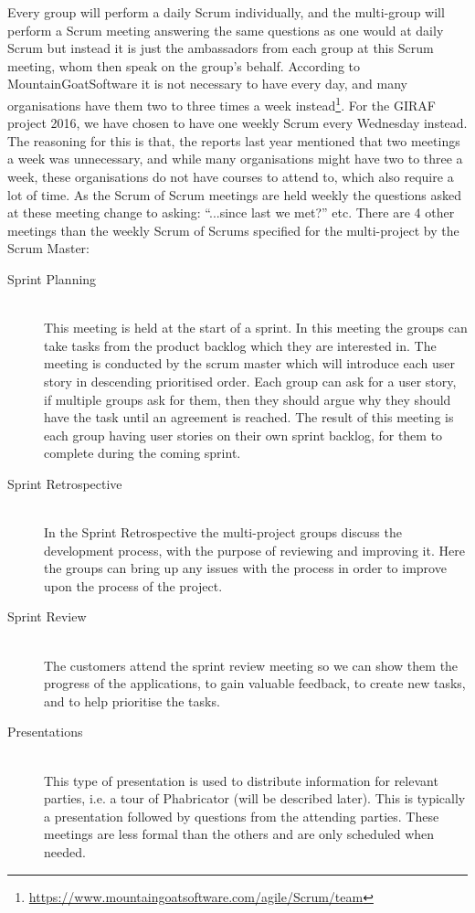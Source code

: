 Every group will perform a daily Scrum individually, and the multi-group will perform a Scrum meeting answering the same questions as one would at daily Scrum but instead it is just the ambassadors from each group at this Scrum meeting, whom then speak on the group's behalf.
According to MountainGoatSoftware it is not necessary to have every day, and many organisations have them two to three times a week instead\footnote{\url{https://www.mountaingoatsoftware.com/agile/Scrum/team}}.
For the GIRAF project 2016, we have chosen to have one weekly Scrum every Wednesday instead.
The reasoning for this is that, the reports last year mentioned that two meetings a week was unnecessary, and while many organisations might have two to three a week, these organisations do not have courses to attend to, which also require a lot of time.
As the Scrum of Scrum meetings are held weekly the questions asked at these meeting change to asking: ``...since last we met?'' etc.
There are 4 other meetings than the weekly Scrum of Scrums specified for the multi-project by the Scrum Master:

\begin{description}
	\item[Sprint Planning] \hfill \\
	This meeting is held at the start of a sprint. 
	In this meeting the groups can take tasks from the product backlog which they are interested in. 
	The meeting is conducted by the scrum master which will introduce each user story in descending prioritised order. 
	Each group can ask for a user story, if multiple groups ask for them, then they should argue why they should have the task until an agreement is reached. 
	The result of this meeting is each group having user stories on their own sprint backlog, for them to complete during the coming sprint. 
	\item[Sprint Retrospective] \hfill \\
	In the Sprint Retrospective the multi-project groups discuss the development process, with the purpose of reviewing and improving it. 
	Here the groups can bring up any issues with the process in order to improve upon the process of the project.
	\item[Sprint Review] \hfill \\
	The customers attend the sprint review meeting so we can show them the progress of the applications, to gain valuable feedback, to create new tasks, and to help prioritise the tasks. 
	\item[Presentations] \hfill \\
	This type of presentation is used to distribute information for relevant parties, i.e. a tour of Phabricator (will be described later). 
	This is typically a presentation followed by questions from the attending parties. 
	These meetings are less formal than the others and are only scheduled when needed.
\end{description}

